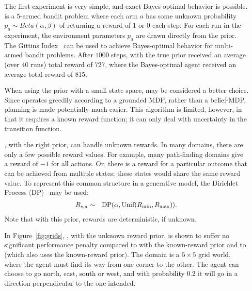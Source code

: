 The first experiment is very simple, and exact Bayes-optimal behavior is possible.  is a $5$-armed bandit problem where each arm $a$ has some unknown probability $p_a \sim Beta(\alpha,\beta)$ of returning a reward of $1$ or $0$ each step. For each run in the experiment, the environment parameters $p_a$ are drawn directly from the prior. The Gittins Index~\cite{gittins89} can be used to achieve Bayes-optimal behavior for multi-armed bandit problems. After $1000$ steps,  with the true prior received an average (over 40 runs) total reward of $727$, where the Bayes-optimal agent received an average total reward of $815$.


When using the  prior with a small state space,  may be considered a better choice. Since  operates greedily according to a grounded MDP, rather than a belief-MDP,  planning is made potentially much easier. This algorithm is limited, however, in that it requires a known reward function; it can only deal with uncertainty in the transition function.

, with the right prior, can handle unknown rewards. In many domains, there are only a few possible reward values. For example, many path-finding domains give a reward of $-1$ for all actions. Or, there is a reward for a particular outcome that can be achieved from multiple states: these states would share the same reward value.  To represent this common structure in a generative model, the Dirichlet Process (DP)~\cite{maceachern98} may be used:
\begin{eqnarray*}
R_{s,a} &\sim& \mbox{DP}(\alpha, \mbox{Unif}(R_{\rm min}, R_{\rm max})).
\end{eqnarray*}
Note that with this prior, rewards are deterministic, if unknown.

In Figure~\ref{fig:grids}, , with the unknown reward prior, is shown to suffer no significant performance penalty compared to  with the known-reward prior and to  (which also uses the known-reward prior). The domain is a $5\times 5$ grid world, where the agent must find its way from one corner to the other. The agent can choose to go north, east, south or west, and with probability $0.2$ it will go in a direction perpendicular to the one intended.



